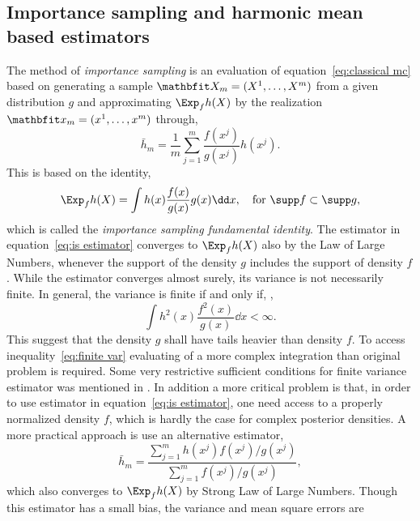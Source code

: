 \subsection{Importance sampling and harmonic mean based estimators}
\label{sub:Importance sampling and harmonic mean based estimators}

The method of \emph{importance sampling} is an evaluation of
equation~\eqref{eq:classical mc} based on generating a sample $\bfX_m = \Xm$
from a given distribution $g$ and approximating $\Exp_f h(X)$ by the
realization $\bfx_m = \xm$ through,
\begin{equation}
  \bar{h}_m = \frac{1}{m}\sum_{j=1}^m \frac{f(x^j)}{g(x^j)}h(x^j).
  \label{eq:is estimator}
\end{equation}
This is based on the identity,
\begin{equation}
  \Exp_f h(X) = \int h(x)\frac{f(x)}{g(x)}g(x)\dd x, \quad \text{for } \supp f \subset \supp g,
\end{equation}
which is called the \emph{importance sampling fundamental identity}. The
estimator in equation~\eqref{eq:is estimator} converges to $\Exp_f h(X)$ also
by the Law of Large Numbers, whenever the support of the density $g$ includes
the support of density $f$. While the estimator converges almost surely, its
variance is not necessarily finite. In general, the variance is finite if and
only if, \parencite[see][sec.~3.3]{Robert2004},
\begin{equation}
  \int h^2(x)\frac{f^2(x)}{g(x)}\dd x < \infty.
  \label{eq:finite var}
\end{equation}
This suggest that the density $g$ shall have tails heavier than density $f$.
To access inequality~\eqref{eq:finite var} evaluating of a more complex
integration than original problem is required. Some very restrictive
sufficient conditions for finite variance estimator was mentioned in
\textcite{Geweke1989}. In addition a more critical problem is that, in order
to use estimator in equation~\eqref{eq:is estimator}, one need access to a
properly normalized density $f$, which is hardly the case for complex
posterior densities. A more practical approach is use an alternative
estimator,
\begin{equation}
  \bar{h}_m =
  \frac{\sum_{j = 1}^m h(x^j) f(x^j) / g(x^j)}{\sum_{j=1}^m f(x^j)/g(x^j)},
  \label{eq:is est}
\end{equation}
which also converges to $\Exp_f h(X)$ by Strong Law of Large Numbers. Though
this estimator has a small bias, the variance and mean square errors are
